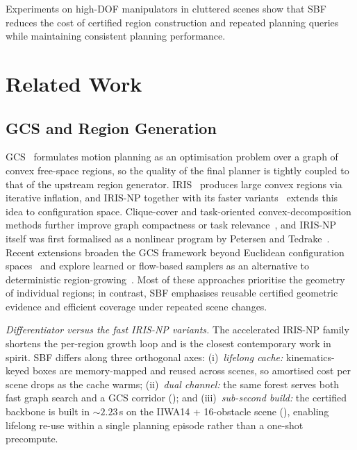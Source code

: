 \documentclass[journal]{IEEEtran}
\begin{document}
Experiments on high-DOF manipulators in cluttered scenes show that SBF
reduces the cost of certified region construction and repeated planning
queries while maintaining consistent planning performance.

\section{Related Work}\label{sec:related}

\subsection{GCS and Region Generation}

GCS~\cite{marcucci2024motion} formulates motion planning as an
optimisation problem over a graph of convex free-space regions, so the
quality of the final planner is tightly coupled to that of the upstream
region generator.
IRIS~\cite{deits2015computing} produces large convex regions via
iterative inflation, and IRIS-NP together with its faster
variants~\cite{werner2024fast,werner2024irisze} extends this idea to
configuration space.
Clique-cover and task-oriented convex-decomposition methods further
improve graph compactness or task relevance~\cite{amice2024clique,
werner2024vcd}, and IRIS-NP itself was first formalised as a nonlinear
program by Petersen and Tedrake~\cite{petersen2023growing}.
Recent extensions broaden the GCS framework beyond Euclidean
configuration spaces~\cite{cohn2023noneuclidean} and explore learned or
flow-based samplers as an alternative to deterministic
region-growing~\cite{wu2024flowgcs}.
Most of these approaches prioritise the geometry of individual regions;
in contrast, SBF emphasises reusable certified geometric evidence and
efficient coverage under repeated scene changes.

\emph{Differentiator versus the fast IRIS-NP variants.}
The accelerated IRIS-NP family~\cite{werner2024fast,werner2024irisze}
shortens the per-region growth loop and is the closest contemporary
work in spirit. SBF differs along three orthogonal axes:
(i)~\emph{lifelong cache:} kinematics-keyed boxes are memory-mapped
and reused across scenes, so amortised cost per scene drops as the
cache warms;
(ii)~\emph{dual channel:} the same forest serves both fast graph
search and a GCS corridor (); and
(iii)~\emph{sub-second build:} the certified backbone is built in
${\sim}2.23$\,s on the IIWA14 + 16-obstacle scene
(), enabling lifelong re-use within a single
planning episode rather than a one-shot precompute.
\end{document}
